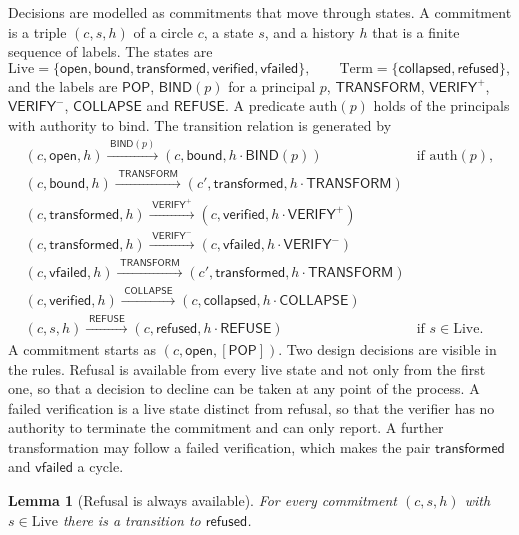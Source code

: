 \documentclass[11pt]{article}
\theoremstyle{plain}
\newtheorem{lemma}[theorem]{Lemma}
\theoremstyle{definition}
\theoremstyle{remark}
\newcommand{\lto}[1]{\xrightarrow{\;#1\;}}
\begin{document}
Decisions are modelled as commitments that move through states. A commitment is a triple $(c,s,h)$ of a circle $c$, a state $s$, and a history $h$ that is a finite sequence of labels. The states are
\[
\mathrm{Live}=\{\mathsf{open},\mathsf{bound},\mathsf{transformed},\mathsf{verified},\mathsf{vfailed}\},\qquad
\mathrm{Term}=\{\mathsf{collapsed},\mathsf{refused}\},
\]
and the labels are $\mathsf{POP}$, $\mathsf{BIND}(p)$ for a principal $p$, $\mathsf{TRANSFORM}$, $\mathsf{VERIFY}^{+}$, $\mathsf{VERIFY}^{-}$, $\mathsf{COLLAPSE}$ and $\mathsf{REFUSE}$. A predicate $\mathrm{auth}(p)$ holds of the principals with authority to bind. The transition relation is generated by
\[
\begin{array}{ll}
(c,\mathsf{open},h)\lto{\mathsf{BIND}(p)}(c,\mathsf{bound},h\cdot\mathsf{BIND}(p)) & \text{if }\mathrm{auth}(p),\\[2pt]
(c,\mathsf{bound},h)\lto{\mathsf{TRANSFORM}}(c',\mathsf{transformed},h\cdot\mathsf{TRANSFORM}) & \\[2pt]
(c,\mathsf{transformed},h)\lto{\mathsf{VERIFY}^{+}}(c,\mathsf{verified},h\cdot\mathsf{VERIFY}^{+}) & \\[2pt]
(c,\mathsf{transformed},h)\lto{\mathsf{VERIFY}^{-}}(c,\mathsf{vfailed},h\cdot\mathsf{VERIFY}^{-}) & \\[2pt]
(c,\mathsf{vfailed},h)\lto{\mathsf{TRANSFORM}}(c',\mathsf{transformed},h\cdot\mathsf{TRANSFORM}) & \\[2pt]
(c,\mathsf{verified},h)\lto{\mathsf{COLLAPSE}}(c,\mathsf{collapsed},h\cdot\mathsf{COLLAPSE}) & \\[2pt]
(c,s,h)\lto{\mathsf{REFUSE}}(c,\mathsf{refused},h\cdot\mathsf{REFUSE}) & \text{if }s\in\mathrm{Live}.
\end{array}
\]
A commitment starts as $(c,\mathsf{open},[\mathsf{POP}])$. Two design decisions are visible in the rules. Refusal is available from every live state and not only from the first one, so that a decision to decline can be taken at any point of the process. A failed verification is a live state distinct from refusal, so that the verifier has no authority to terminate the commitment and can only report. A further transformation may follow a failed verification, which makes the pair $\mathsf{transformed}$ and $\mathsf{vfailed}$ a cycle.

\begin{lemma}[Refusal is always available]\label{lem:refuse}
For every commitment $(c,s,h)$ with $s\in\mathrm{Live}$ there is a transition to $\mathsf{refused}$.
\end{lemma}
\end{document}
